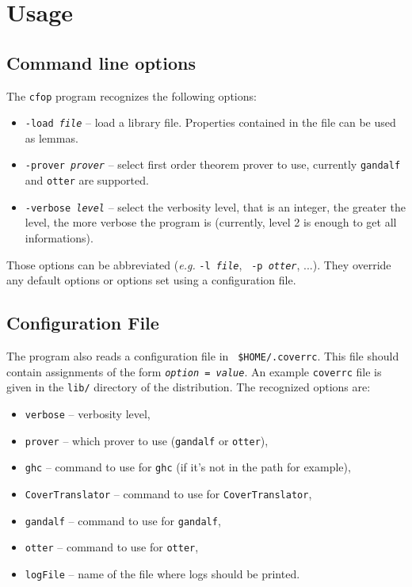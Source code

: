 \documentclass{article}
\newcommand{\cfop}{{\tt cfop}\xspace}
\begin{document}
\section{Usage}
\label{sec:usage}

\subsection{Command line options}
The \cfop program recognizes the following options:
\begin{itemize}
\item {\tt -load {\it file}} -- load a library file. Properties
contained in the file can be used as lemmas.
\item {\tt -prover {\it prover}} -- select first order theorem prover to use,
currently {\tt gandalf} and {\tt otter} are supported.
\item {\tt -verbose {\it level}} -- select the verbosity level, that
is an integer, the greater the level, the more verbose the program is
(currently, level 2 is enough to get all informations).
\end{itemize}
Those options can be abbreviated ({\it e.g.} {\tt -l \it file}, {\tt
  -p \it otter}, ...). They override any default options or options
set using a configuration file.

\subsection{Configuration File}
\label{sec:configuration-file}
The program also reads a configuration file in {\tt
\$HOME/.coverrc}. This file should contain assignments of the form
{\tt \it option = value}. An example {\tt coverrc} file is given in
the {\tt lib/} directory of the distribution. The recognized options
are: 
\begin{itemize}
\item {\tt verbose} -- verbosity level,
\item {\tt prover} -- which prover to use ({\tt gandalf} or {\tt otter}),
\item {\tt ghc} -- command to use for {\tt ghc} (if it's not in the path for 
  example),
\item {\tt CoverTranslator} -- command to use for {\tt CoverTranslator},
\item {\tt gandalf} -- command to use for {\tt gandalf},
\item {\tt otter} -- command to use for {\tt otter},
\item {\tt logFile} -- name of the file where logs should be printed.
\end{itemize}
\end{document}
